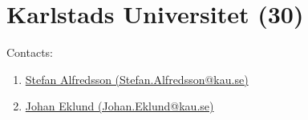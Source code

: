\section{Karlstads Universitet (30)}
\label{sec:KAU}

Contacts:
\begin{enumerate}
 \item {}\href{mailto:Stefan.Alfredsson@kau.se}{Stefan Alfredsson (Stefan.Alfredsson@kau.se)}
 \item {}\href{mailto:Johan.Eklund@kau.se}{Johan Eklund (Johan.Eklund@kau.se)}
\end{enumerate}

